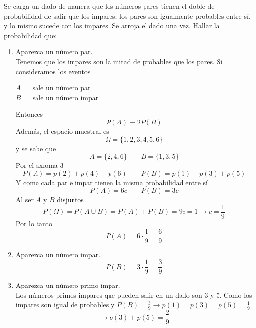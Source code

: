 \item Se carga un dado de manera que los números pares tienen el doble de probabilidad de salir que los impares; los pares son igualmente probables entre sí, y lo mismo sucede con los impares. Se arroja el dado una vez. Hallar la probabilidad que:
    \begin{enumerate}
        \item Aparezca un número par.\e\\
            Tenemos que los impares son la mitad de probables que los pares. Si consideramos los eventos
            \begin{center}
                $A=$ sale un número par\\
                $B=$ sale un número impar
            \end{center}
            Entonces\[P(A)=2P(B)\]
            Además, el espacio muestral es\[\Omega=\{1,2,3,4,5,6\}\]
            y se sabe que\[A=\{2,4,6\}\qquad B=\{1,3,5\}\]
            Por el axioma 3\[P(A)=p(2)+p(4)+p(6)\qquad P(B)=p(1)+p(3)+p(5)\]
            Y como cada par e impar tienen la misma probabilidad entre sí\[P(A)=6c\qquad P(B)=3c\]
            Al ser $A$ y $B$ disjuntos\[P(\Omega)=P(A\cup B)=P(A)+P(B)=9c=1\to c=\frac{1}{9}\]
            Por lo tanto\[P(A)=6\cdot\frac{1}{9}=\frac{6}{9}\]
        \item Aparezca un número impar.
            \[P(B)=3\cdot\frac{1}{9}=\frac{3}{9}\]
        \item Aparezca un número primo impar.\e\\
            Los números primos impares que pueden salir en un dado son 3 y 5. Como los impares son igual de probables y $P(B)=\frac{3}{9}\to p(1)=p(3)=p(5)=\frac{1}{9}$\[\to p(3)+p(5)=\frac{2}{9}\]
    \end{enumerate}